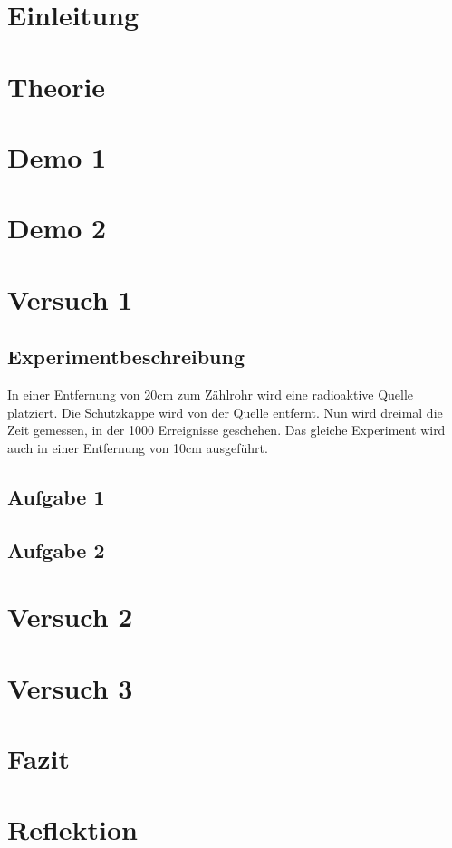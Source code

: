 \documentclass[12pt, a4paper, twoside]{article}
\begin{document}
\maketitlepage


\section{Einleitung}
\section{Theorie}
\section{Demo 1}
\section{Demo 2}
\section{Versuch 1}
\subsection{Experimentbeschreibung}
In einer Entfernung von 20cm zum Zählrohr wird eine radioaktive Quelle platziert.
Die Schutzkappe wird von der Quelle entfernt.
Nun wird dreimal die Zeit gemessen, in der 1000 Erreignisse geschehen.
Das gleiche Experiment wird auch in einer Entfernung von 10cm ausgeführt.
\subsection{Aufgabe 1}
\subsection{Aufgabe 2}

\section{Versuch 2}
\section{Versuch 3}
\section{Fazit}
\section{Reflektion}
\end{document}
